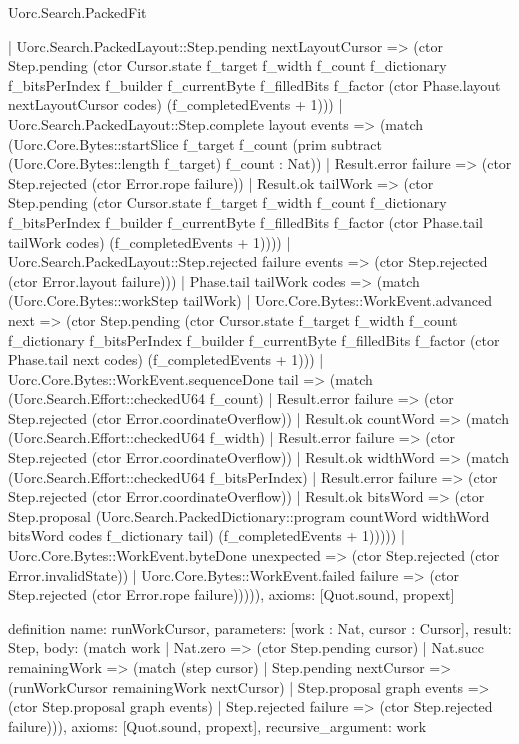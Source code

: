 \begin{lexlean}{Uorc.Search.PackedFit}
\begin{semanticmodule}
{        | Uorc.Search.PackedLayout::Step.pending nextLayoutCursor => (ctor Step.pending (ctor Cursor.state f_target f_width f_count f_dictionary f_bitsPerIndex f_builder f_currentByte f_filledBits f_factor (ctor Phase.layout nextLayoutCursor codes) (f_completedEvents + 1)))
        | Uorc.Search.PackedLayout::Step.complete layout events => (match (Uorc.Core.Bytes::startSlice f_target f_count (prim subtract (Uorc.Core.Bytes::length f_target) f_count : Nat))
          | Result.error failure => (ctor Step.rejected (ctor Error.rope failure))
          | Result.ok tailWork => (ctor Step.pending (ctor Cursor.state f_target f_width f_count f_dictionary f_bitsPerIndex f_builder f_currentByte f_filledBits f_factor (ctor Phase.tail tailWork codes) (f_completedEvents + 1))))
        | Uorc.Search.PackedLayout::Step.rejected failure events => (ctor Step.rejected (ctor Error.layout failure)))
      | Phase.tail tailWork codes => (match (Uorc.Core.Bytes::workStep tailWork)
        | Uorc.Core.Bytes::WorkEvent.advanced next => (ctor Step.pending (ctor Cursor.state f_target f_width f_count f_dictionary f_bitsPerIndex f_builder f_currentByte f_filledBits f_factor (ctor Phase.tail next codes) (f_completedEvents + 1)))
        | Uorc.Core.Bytes::WorkEvent.sequenceDone tail => (match (Uorc.Search.Effort::checkedU64 f_count)
          | Result.error failure => (ctor Step.rejected (ctor Error.coordinateOverflow))
          | Result.ok countWord => (match (Uorc.Search.Effort::checkedU64 f_width)
            | Result.error failure => (ctor Step.rejected (ctor Error.coordinateOverflow))
            | Result.ok widthWord => (match (Uorc.Search.Effort::checkedU64 f_bitsPerIndex)
              | Result.error failure => (ctor Step.rejected (ctor Error.coordinateOverflow))
              | Result.ok bitsWord => (ctor Step.proposal (Uorc.Search.PackedDictionary::program countWord widthWord bitsWord codes f_dictionary tail) (f_completedEvents + 1)))))
        | Uorc.Core.Bytes::WorkEvent.byteDone unexpected => (ctor Step.rejected (ctor Error.invalidState))
        | Uorc.Core.Bytes::WorkEvent.failed failure => (ctor Step.rejected (ctor Error.rope failure))))),
  axioms: [Quot.sound, propext]
}

definition{
  name: runWorkCursor,
  parameters: [work : Nat, cursor : Cursor],
  result: Step,
  body: (match work
    | Nat.zero => (ctor Step.pending cursor)
    | Nat.succ remainingWork => (match (step cursor)
      | Step.pending nextCursor => (runWorkCursor remainingWork nextCursor)
      | Step.proposal graph events => (ctor Step.proposal graph events)
      | Step.rejected failure => (ctor Step.rejected failure))),
  axioms: [Quot.sound, propext],
  recursive_argument: work
}


\end{semanticmodule}
\end{lexlean}
